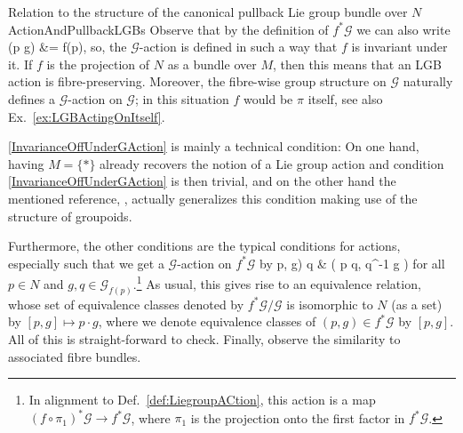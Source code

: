 \documentclass[a4paper,oneside,11pt,bibliography=totoc]{scrartcl}
\def\ba#1\ea{\begin{align}#1\end{align}}
\def\bas#1\eas{\begin{align*}#1\end{align*}}
\theoremstyle{plain}
\theoremstyle{remark}
\theoremstyle{definition}
\begin{document}
\begin{remarks}{Relation to the structure of the canonical pullback Lie group bundle over $N$}{ActionAndPullbackLGBs}
Observe that by the definition of $f^*\mathcal{G}$ we can also write
\bas
f(p \cdot g) &= f(p),
\eas
so, the $\mathcal{G}$-action is defined in such a way that $f$ is invariant under it. If $f$ is the projection of $N$ as a bundle over $M$, then this means that an LGB action is fibre-preserving. Moreover, the fibre-wise group structure on $\mathcal{G}$ naturally defines a $\mathcal{G}$-action on $\mathcal{G}$; in this situation $f$ would be $\pi$ itself, see also Ex.\ \ref{ex:LGBActingOnItself}. 

\eqref{InvarianceOffUnderGAction} is mainly a technical condition: On one hand, having $M = \{*\}$ already recovers the notion of a Lie group action and condition \eqref{InvarianceOffUnderGAction} is then trivial, and on the other hand the mentioned reference, \cite[\S 1.6, Def.\ 1.6.1, page 34]{mackenzieGeneralTheory}, actually generalizes this condition making use of the structure of groupoids.
\newline

Furthermore, the other conditions are the typical conditions for actions, especially such that we get a $\mathcal{G}$-action on $f^*\mathcal{G}$ by
\ba
(p, g) \cdot q
&\coloneqq
\mleft( p \cdot q, q^{-1} g \mright)
\ea
for all $p \in N$ and $g, q \in \mathcal{G}_{f(p)}$.\footnote{In alignment to Def.\ \ref{def:LiegroupACtion}, this action is a map $(f \circ \pi_1)^*\mathcal{G} \to f^*\mathcal{G}$, where $\pi_1$ is the projection onto the first factor in $f^*\mathcal{G}$.}
As usual, this gives rise to an equivalence relation, whose set of equivalence classes denoted by $f^*\mathcal{G} \Big/ \mathcal{G}$ is isomorphic to $N$ (as a set) by $[p, g] \mapsto p \cdot g$, where we denote equivalence classes of $(p, g) \in f^*\mathcal{G}$ by $[p, g]$. All of this is straight-forward to check. Finally, observe the similarity to associated fibre bundles.
\end{remarks}
\end{document}
